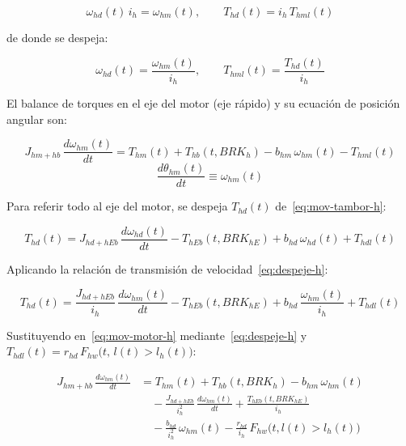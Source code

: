 \documentclass[12pt, a4paper]{article}
\begin{document}
\begin{equation}
    \label{eq:relacion-h}
    \omega_{hd}(t)\,i_h = \omega_{hm}(t), \qquad T_{hd}(t) = i_h\,T_{hml}(t)
\end{equation}

de donde se despeja:

\begin{equation}
    \label{eq:despeje-h}
    \omega_{hd}(t) = \frac{\omega_{hm}(t)}{i_h}, \qquad
    T_{hml}(t) = \frac{T_{hd}(t)}{i_h}
\end{equation}

El balance de torques en el eje del motor (eje rápido) y su ecuación de posición
angular son:

\begin{equation}
    \label{eq:mov-motor-h}
    J_{hm+hb}\,\frac{d\omega_{hm}(t)}{dt} = T_{hm}(t) + T_{hb}(t,BRK_h)
    - b_{hm}\,\omega_{hm}(t) - T_{hml}(t)
\end{equation}
\begin{equation}
    \frac{d\theta_{hm}(t)}{dt} \equiv \omega_{hm}(t)
\end{equation}

Para referir todo al eje del motor, se despeja $T_{hd}(t)$ de~\eqref{eq:mov-tambor-h}:

\begin{equation}
    T_{hd}(t) = J_{hd+hEb}\,\frac{d\omega_{hd}(t)}{dt}
    - T_{hEb}(t,BRK_{hE}) + b_{hd}\,\omega_{hd}(t) + T_{hdl}(t)
\end{equation}

Aplicando la relación de transmisión de velocidad~\eqref{eq:despeje-h}:

\begin{equation}
    T_{hd}(t) = \frac{J_{hd+hEb}}{i_h}\,\frac{d\omega_{hm}(t)}{dt}
    - T_{hEb}(t,BRK_{hE}) + b_{hd}\,\frac{\omega_{hm}(t)}{i_h} + T_{hdl}(t)
\end{equation}

Sustituyendo en~\eqref{eq:mov-motor-h} mediante~\eqref{eq:despeje-h} y
$T_{hdl}(t) = r_{hd}\,F_{hw}\!\bigl(t,\,l(t) > l_h(t)\bigr)$:

\begin{equation}
\begin{split}
    J_{hm+hb}\,\frac{d\omega_{hm}(t)}{dt}
    &= T_{hm}(t) + T_{hb}(t,BRK_h) - b_{hm}\,\omega_{hm}(t) \\[4pt]
    &\quad - \frac{J_{hd+hEb}}{i_h^2}\,\frac{d\omega_{hm}(t)}{dt}
             + \frac{T_{hEb}(t,BRK_{hE})}{i_h} \\[4pt]
    &\quad - \frac{b_{hd}}{i_h^2}\,\omega_{hm}(t)
             - \frac{r_{hd}}{i_h}\,F_{hw}\!\bigl(t,l(t)>l_h(t)\bigr)
\end{split}
\end{equation}
\end{document}
